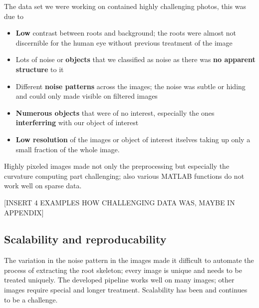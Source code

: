 The data set we were working on contained highly challenging photos, this was due to
\begin{itemize}
	\item \textbf{Low} contrast between roots and background; the roots were almost not discernible for the human eye without previous treatment of the image
	\item Lots of noise or \textbf{objects} that we classified as noise as there was \textbf{no apparent structure} to it
	\item Different \textbf{noise patterns} across the images; the noise was subtle or hiding and could only made visible on filtered images
	\item \textbf{Numerous objects} that were of no interest, especially the ones \textbf{interferring} with our object of interest
	\item \textbf{Low resolution} of the images or object of interest itselves taking up only a small fraction of the whole image. 
\end{itemize}
Highly pixeled images made not only the preprocessing but especially the curvature computing part challenging; also various MATLAB functions do not work well on sparse data.

[INSERT 4 EXAMPLES HOW CHALLENGING DATA WAS, MAYBE IN APPENDIX]



\subsection{Scalability and reproducability}

The variation in the noise pattern in the images made it difficult to automate the process of extracting the root skeleton; every image is unique and needs to be treated uniquely. The developed pipeline works well on many images; other images require special and longer treatment. Scalability has been and continues to be a challenge.

